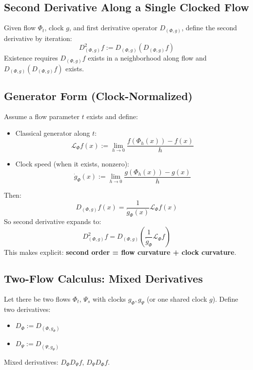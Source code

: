 \documentclass[12pt, oneside]{article}
\begin{document}
\subsection{Second Derivative Along a Single Clocked Flow}

Given flow $\Phi_t$, clock $g$, and first derivative operator $D_{(\Phi,g)}$, define the second derivative by iteration:
\begin{equation}
D_{(\Phi,g)}^2 f := D_{(\Phi,g)} (D_{(\Phi,g)} f)
\end{equation}
Existence requires $D_{(\Phi,g)} f$ exists in a neighborhood along flow and $D_{(\Phi,g)} (D_{(\Phi,g)} f)$ exists.

\subsection{Generator Form (Clock-Normalized)}

Assume a flow parameter $t$ exists and define:
\begin{itemize}
    \item Classical generator along $t$:
    \begin{equation}
    \mathcal{L}_\Phi f(x) := \lim_{h \to 0} \frac{f(\Phi_h(x)) - f(x)}{h}
    \end{equation}
    \item Clock speed (when it exists, nonzero):
    \begin{equation}
    \dot{g}_\Phi(x) := \lim_{h \to 0} \frac{g(\Phi_h(x)) - g(x)}{h}
    \end{equation}
\end{itemize}
Then:
\begin{equation}
D_{(\Phi,g)} f(x) = \frac{1}{\dot{g}_\Phi(x)} \mathcal{L}_\Phi f(x)
\end{equation}
So second derivative expands to:
\begin{equation}
D_{(\Phi,g)}^2 f = D_{(\Phi,g)} \left( \frac{1}{\dot{g}_\Phi} \mathcal{L}_\Phi f \right)
\end{equation}
This makes explicit: \textbf{second order = flow curvature + clock curvature}.

\subsection{Two-Flow Calculus: Mixed Derivatives}

Let there be two flows $\Phi_t$, $\Psi_s$ with clocks $g_\Phi, g_\Psi$ (or one shared clock $g$). Define two derivatives:
\begin{itemize}
    \item $D_\Phi := D_{(\Phi, g_\Phi)}$
    \item $D_\Psi := D_{(\Psi, g_\Psi)}$
\end{itemize}
Mixed derivatives: $D_\Phi D_\Psi f$, $D_\Psi D_\Phi f$.
\end{document}
